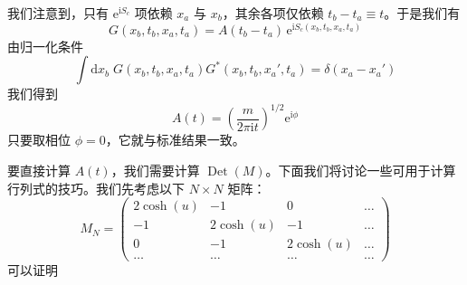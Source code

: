 我们注意到，只有 $\mathrm{e}^{\mathrm{i}S_c}$ 项依赖 $x_a$ 与 $x_b$，其余各项仅依赖 $t_b - t_a \equiv t$。于是我们有
\begin{equation*}
G(x_b,t_b,x_a,t_a) = A(t_b-t_a)\,\mathrm{e}^{\mathrm{i}S_c(x_b,t_b,x_a,t_a)} \tag{2.1.18}
\end{equation*}
由归一化条件
\begin{equation*}
\int \mathrm{d}x_b\; G(x_b,t_b,x_a,t_a)G^*(x_b,t_b,x_a',t_a) = \delta(x_a-x_a')
\end{equation*}
我们得到
\begin{equation*}
A(t) = \left(\frac{m}{2\pi\mathrm{i}t}\right)^{1/2}\mathrm{e}^{\mathrm{i}\phi}
\end{equation*}
只要取相位 $\phi = 0$，它就与标准结果一致。

要直接计算 $A(t)$，我们需要计算 $\operatorname{Det}(M)$。下面我们将讨论一些可用于计算行列式的技巧。我们先考虑以下 $N\times N$ 矩阵：
\begin{equation*}
M_N = \left(\begin{array}{cccc} 2\cosh(u) & -1 & 0 & \dots\\ -1 & 2\cosh(u) & -1 & \dots\\ 0 & -1 & 2\cosh(u) & \dots\\ \dots & \dots & \dots & \dots \end{array}\right)
\end{equation*}
可以证明

